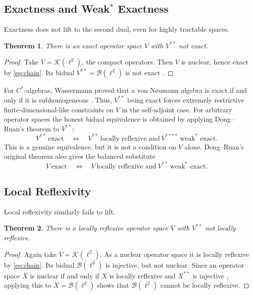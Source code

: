 \documentclass[12pt]{article}
\newtheorem{theorem}{Theorem}[section]
\theoremstyle{definition}
\theoremstyle{remark}
\newcommand{\B}{\mathcal{B}}
\newcommand{\K}{\mathcal{K}}
\begin{document}
\subsection{Exactness and Weak$^*$ Exactness}

Exactness does not lift to the second dual, even for highly tractable spaces.

\begin{theorem}\label{thm:exact-nolift}
There is an exact operator space $V$ with $V^{**}$ not exact.
\end{theorem}

\begin{proof}
Take $V=\K(\ell^2)$, the compact operators. Then $V$ is nuclear, hence exact
by \eqref{eq:chain}. Its bidual $V^{**}=\B(\ell^2)$ is not exact
\cite[\S 9.3]{Pi03}. 
\end{proof}

For $C^*$-algebras, Wassermann proved that a von Neumann algebra is exact if and
only if it is subhomogeneous \cite{Wa94}. Thus, $V^{**}$ being exact forces extremely
restrictive finite-dimensional-like constraints on $V$ in the self-adjoint case.
For arbitrary operator spaces the honest bidual equivalence is obtained by
applying Dong--Ruan's theorem to $V^{**}$:
\[
V^{**}\ \text{exact}\quad\Longleftrightarrow\quad
V^{**}\ \text{locally reflexive and}\ V^{****}\ \text{weak}^*\text{ exact}.
\]
This is a genuine equivalence, but it is not a condition on $V$ alone.
Dong--Ruan's original theorem also gives the balanced substitute
\begin{equation}
V\ \text{exact}\quad\Longleftrightarrow\quad V\ \text{locally reflexive and}\
V^{**}\ \text{weak}^*\text{ exact}.
\end{equation}

\subsection{Local Reflexivity}

Local reflexivity similarly fails to lift.

\begin{theorem}\label{thm:lr-nolift}
There is a locally reflexive operator space $V$ with $V^{**}$ not locally reflexive.
\end{theorem}

\begin{proof}
Again take $V=\K(\ell^2)$. As a nuclear operator space it is locally reflexive
by \eqref{eq:chain}. Its bidual $\B(\ell^2)$ is injective, but not nuclear.
Since an operator space $X$ is nuclear if and only if $X$ is locally reflexive and
$X^{**}$ is injective \cite{EOR}, applying this to $X=\B(\ell^2)$ shows that $\B(\ell^2)$
cannot be locally reflexive.
\end{proof}
\end{document}
